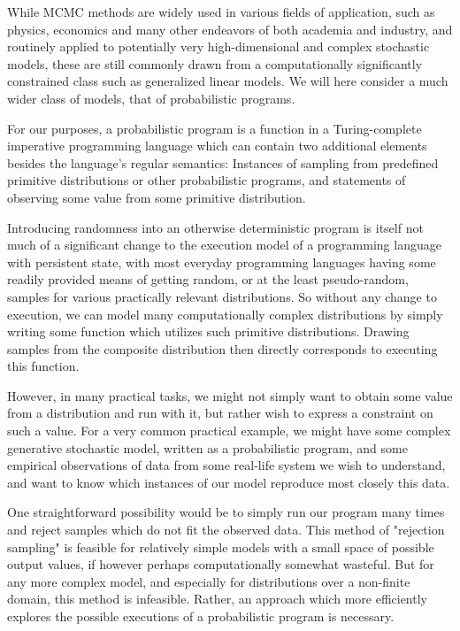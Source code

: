 While MCMC methods are widely used in various fields of application, such as physics, economics and many other endeavors of both academia and industry, and routinely applied to potentially very high-dimensional and complex stochastic models, these are still commonly drawn from a computationally significantly constrained class such as generalized linear models. We will here consider a much wider class of models, that of probabilistic programs.

For our purposes, a probabilistic program is a function in a Turing-complete imperative programming language which can contain two additional elements besides the language's regular semantics: Instances of sampling from predefined primitive distributions or other probabilistic programs, and statements of observing some value from some primitive distribution.

Introducing randomness into an otherwise deterministic program is itself not much of a significant change to the execution model of a programming language with persistent state, with most everyday programming languages having some readily provided means of getting random, or at the least pseudo-random, samples for various practically relevant distributions. So without any change to execution, we can model many computationally complex distributions by simply writing some function which utilizes such primitive distributions. Drawing samples from the composite distribution then directly corresponds to executing this function.

However, in many practical tasks, we might not simply want to obtain some value from a distribution and run with it, but rather wish to express a constraint on such a value. For a very common practical example, we might have some complex generative stochastic model, written as a probabilistic program, and some empirical observations of data from some real-life system we wish to understand, and want to know which instances of our model reproduce most closely this data.

One straightforward possibility would be to simply run our program many times and reject samples which do not fit the observed data. This method of "rejection sampling" is feasible for relatively simple models with a small space of possible output values, if however perhaps computationally somewhat wasteful. But for any more complex model, and especially for distributions over a non-finite domain, this method is infeasible. Rather, an approach which more efficiently explores the possible executions of a probabilistic program is necessary.

